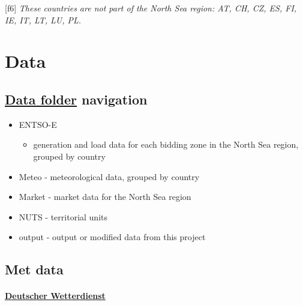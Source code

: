 \protect\hypertarget{f6}{}{{[}f6{]}} \emph{These countries are not part
of the North Sea region: AT, CH, CZ, ES, FI, IE, IT, LT, LU, PL.}

\hypertarget{data}{%
\section{Data}\label{data}}

\hypertarget{data-folder-navigation}{%
\subsection{\texorpdfstring{\href{https://drive.google.com/drive/folders/1_3Y30j_c-4iai0WuhcrysXHYdZ4F2AKB}{Data
folder}
navigation}{Data folder navigation}}\label{data-folder-navigation}}

\begin{itemize}
\tightlist
\item
  ENTSO-E

  \begin{itemize}
  \tightlist
  \item
    generation and load data for each bidding zone in the North Sea
    region, grouped by country
  \end{itemize}
\item
  Meteo - meteorological data, grouped by country
\item
  Market - market data for the North Sea region
\item
  NUTS - territorial units
\item
  output - output or modified data from this project
\end{itemize}

\hypertarget{met-data}{%
\subsection{Met data}\label{met-data}}

\hypertarget{deutscher-wetterdienst}{%
\paragraph{\texorpdfstring{\href{https://www.dwd.de/EN/climate_environment/cdc/cdc_node.html}{Deutscher
Wetterdienst}}{Deutscher Wetterdienst}}\label{deutscher-wetterdienst}}

